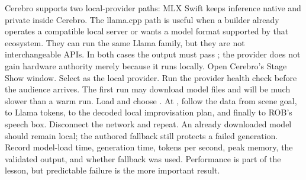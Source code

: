 {}Cerebro supports two local-provider paths:\markdownRendererInterblockSeparator
{}\markdownRendererInterblockSeparator
{}MLX Swift keeps inference native and private inside Cerebro. The llama.cpp\markdownRendererSoftLineBreak
{}path is useful when a builder already operates a compatible local server or\markdownRendererSoftLineBreak
{}wants a model format supported by that ecosystem. They can run the same Llama\markdownRendererSoftLineBreak
{}family, but they are not interchangeable APIs. In both cases the output must\markdownRendererSoftLineBreak
{}pass ; the provider does not gain hardware\markdownRendererSoftLineBreak
{}authority merely because it runs locally.\markdownRendererInterblockSeparator
{}
\markdownRendererSectionEnd \markdownRendererSectionBegin
{}\markdownRendererInterblockSeparator
{}\markdownRendererOlBegin
{}Open Cerebro's Stage Show window.\markdownRendererOlItemEnd 
{}Select  as the local provider.\markdownRendererOlItemEnd 
{}Run the provider health check before the audience arrives. The first run\markdownRendererSoftLineBreak
{}may download model files and will be much slower than a warm run.\markdownRendererOlItemEnd 
{}Load  and choose .\markdownRendererOlItemEnd 
{}At , follow the data from scene goal, to Llama tokens, to the\markdownRendererSoftLineBreak
{}decoded local improvisation plan, and finally to ROB's speech box.\markdownRendererOlItemEnd 
{}Disconnect the network and repeat. An already downloaded model should\markdownRendererSoftLineBreak
{}remain local; the authored fallback still protects a failed generation.\markdownRendererOlItemEnd 
\markdownRendererOlEnd \markdownRendererInterblockSeparator
{}Record model-load time, generation time, tokens per second, peak memory, the\markdownRendererSoftLineBreak
{}validated output, and whether fallback was used. Performance is part of the\markdownRendererSoftLineBreak
{}lesson, but predictable failure is the more important result.\markdownRendererInterblockSeparator
